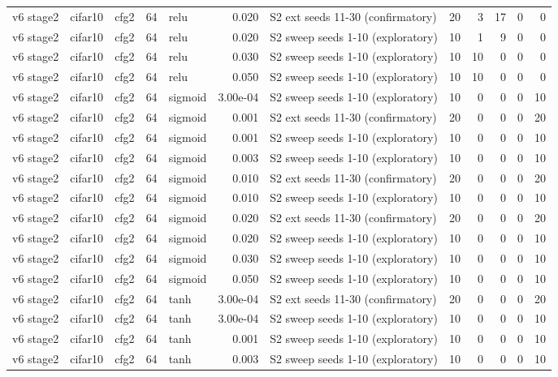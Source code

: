 \begin{table}[htbp]
{\begin{tabular}{@{}lllrlrlrrrrr@{}}
v6 stage2 & cifar10 & cfg2 & 64 & relu & 0.020 & S2 ext seeds 11-30 (confirmatory) & 20 & 3 & 17 & 0 & 0 \\
v6 stage2 & cifar10 & cfg2 & 64 & relu & 0.020 & S2 sweep seeds 1-10 (exploratory) & 10 & 1 & 9 & 0 & 0 \\
v6 stage2 & cifar10 & cfg2 & 64 & relu & 0.030 & S2 sweep seeds 1-10 (exploratory) & 10 & 10 & 0 & 0 & 0 \\
v6 stage2 & cifar10 & cfg2 & 64 & relu & 0.050 & S2 sweep seeds 1-10 (exploratory) & 10 & 10 & 0 & 0 & 0 \\
v6 stage2 & cifar10 & cfg2 & 64 & sigmoid & 3.00e-04 & S2 sweep seeds 1-10 (exploratory) & 10 & 0 & 0 & 0 & 10 \\
v6 stage2 & cifar10 & cfg2 & 64 & sigmoid & 0.001 & S2 ext seeds 11-30 (confirmatory) & 20 & 0 & 0 & 0 & 20 \\
v6 stage2 & cifar10 & cfg2 & 64 & sigmoid & 0.001 & S2 sweep seeds 1-10 (exploratory) & 10 & 0 & 0 & 0 & 10 \\
v6 stage2 & cifar10 & cfg2 & 64 & sigmoid & 0.003 & S2 sweep seeds 1-10 (exploratory) & 10 & 0 & 0 & 0 & 10 \\
v6 stage2 & cifar10 & cfg2 & 64 & sigmoid & 0.010 & S2 ext seeds 11-30 (confirmatory) & 20 & 0 & 0 & 0 & 20 \\
v6 stage2 & cifar10 & cfg2 & 64 & sigmoid & 0.010 & S2 sweep seeds 1-10 (exploratory) & 10 & 0 & 0 & 0 & 10 \\
v6 stage2 & cifar10 & cfg2 & 64 & sigmoid & 0.020 & S2 ext seeds 11-30 (confirmatory) & 20 & 0 & 0 & 0 & 20 \\
v6 stage2 & cifar10 & cfg2 & 64 & sigmoid & 0.020 & S2 sweep seeds 1-10 (exploratory) & 10 & 0 & 0 & 0 & 10 \\
v6 stage2 & cifar10 & cfg2 & 64 & sigmoid & 0.030 & S2 sweep seeds 1-10 (exploratory) & 10 & 0 & 0 & 0 & 10 \\
v6 stage2 & cifar10 & cfg2 & 64 & sigmoid & 0.050 & S2 sweep seeds 1-10 (exploratory) & 10 & 0 & 0 & 0 & 10 \\
v6 stage2 & cifar10 & cfg2 & 64 & tanh & 3.00e-04 & S2 ext seeds 11-30 (confirmatory) & 20 & 0 & 0 & 0 & 20 \\
v6 stage2 & cifar10 & cfg2 & 64 & tanh & 3.00e-04 & S2 sweep seeds 1-10 (exploratory) & 10 & 0 & 0 & 0 & 10 \\
v6 stage2 & cifar10 & cfg2 & 64 & tanh & 0.001 & S2 sweep seeds 1-10 (exploratory) & 10 & 0 & 0 & 0 & 10 \\
v6 stage2 & cifar10 & cfg2 & 64 & tanh & 0.003 & S2 sweep seeds 1-10 (exploratory) & 10 & 0 & 0 & 0 & 10 \\

\end{tabular}}
\end{table}
